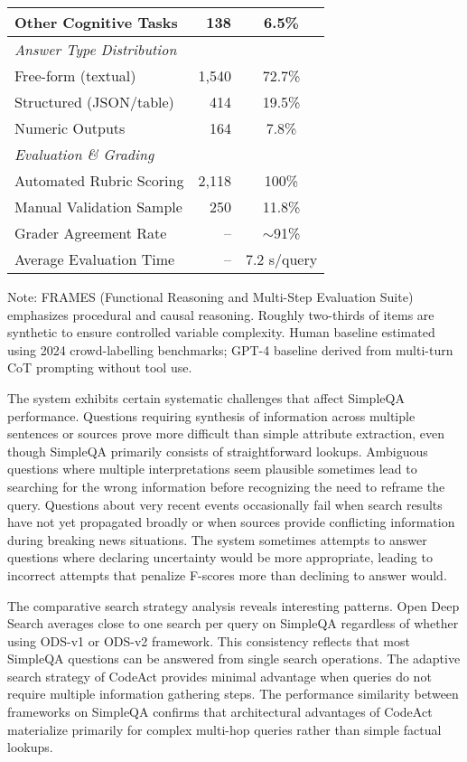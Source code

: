 \begin{table}[htbp]
\begin{tabular}{lrc}
Other Cognitive Tasks & 138 & 6.5\% \\
\hline
\multicolumn{3}{l}{\textit{Answer Type Distribution}} \\
Free-form (textual) & 1,540 & 72.7\% \\
Structured (JSON/table) & 414 & 19.5\% \\
Numeric Outputs & 164 & 7.8\% \\
\hline
\multicolumn{3}{l}{\textit{Evaluation \& Grading}} \\
Automated Rubric Scoring & 2,118 & 100\% \\
Manual Validation Sample & 250 & 11.8\% \\
Grader Agreement Rate & -- & $\sim$91\% \\
Average Evaluation Time & -- & 7.2 s/query \\
\hline
\end{tabular}
\begin{tablenotes}\small
\item Note: FRAMES (Functional Reasoning and Multi-Step Evaluation Suite) emphasizes procedural and causal reasoning. 
Roughly two-thirds of items are synthetic to ensure controlled variable complexity. 
Human baseline estimated using 2024 crowd-labelling benchmarks; GPT-4 baseline derived from multi-turn CoT prompting without tool use.
\end{tablenotes}
\end{table}


The system exhibits certain systematic challenges that affect SimpleQA performance. Questions requiring synthesis of information across multiple sentences or sources prove more difficult than simple attribute extraction, even though SimpleQA primarily consists of straightforward lookups. Ambiguous questions where multiple interpretations seem plausible sometimes lead to searching for the wrong information before recognizing the need to reframe the query. Questions about very recent events occasionally fail when search results have not yet propagated broadly or when sources provide conflicting information during breaking news situations. The system sometimes attempts to answer questions where declaring uncertainty would be more appropriate, leading to incorrect attempts that penalize F-scores more than declining to answer would.

The comparative search strategy analysis reveals interesting patterns. Open Deep Search averages close to one search per query on SimpleQA regardless of whether using ODS-v1 or ODS-v2 framework. This consistency reflects that most SimpleQA questions can be answered from single search operations. The adaptive search strategy of CodeAct provides minimal advantage when queries do not require multiple information gathering steps. The performance similarity between frameworks on SimpleQA confirms that architectural advantages of CodeAct materialize primarily for complex multi-hop queries rather than simple factual lookups.

